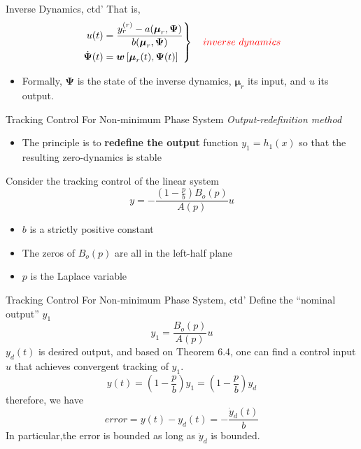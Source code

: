 \documentclass{beamer}
\renewcommand{\vec}[1]{\ensuremath{\boldsymbol{#1}}} %
\begin{document}
\begin{frame}{Inverse Dynamics, ctd'}
    That is, 
    \begin{equation}\label{inverse-dynamics}
      \left. \begin{aligned}
        u(t) &= \frac{y_{r}^{(r)}-a(\vec{\mu}_{r}, \vec{\Psi})}{b(\vec{\mu}_{r}, \vec{\Psi})} \\
        \dot{\vec{\Psi}}(t) &= \vec{w}\left[ \vec{\mu}_{r}(t),\vec{\Psi}(t) \right]
      \end{aligned} \right\} \quad {\color{red}inverse ~dynamics}
    \end{equation}
    \begin{itemize}
      \item Formally, $\vec{\Psi}$ is the state of the inverse dynamics, $\vec{\mu}_{r}$ its input, and $u$ its output.
    \end{itemize}
\end{frame}


\begin{frame}{Tracking Control For Non-minimum Phase System}
    \textit{\color{red}\large{Output-redefinition method}}
    \begin{itemize}
      \item The principle is to \textbf{redefine the output} function $y_{1}=h_{1}(x)$ so that the resulting zero-dynamics is stable
    \end{itemize}
    Consider the tracking control of the linear system
    \begin{equation}
        y=-\frac{\left(1-\frac{p}{b}\right) B_{o}(p)}{A(p)}u
    \end{equation}
    \begin{itemize}
      \item $b$ is a strictly positive constant
      \item The zeros of $B_{o}(p)$ are all in the left-half plane
      \item $p$ is the Laplace variable
    \end{itemize}
\end{frame}

\begin{frame}{Tracking Control For Non-minimum Phase System, ctd'}
    Define the {\color{red}``nominal output'' $y_{1}$}
    \begin{equation}\label{y1}
      y_{1}=\frac{B_{o}(p)}{A(p)}u
    \end{equation}
    $y_{d}(t)$ is desired output, and based on Theorem 6.4, one can find a control input $u$ that achieves {\color{red}convergent tracking of $y_{1}$}.
    \begin{equation}
        y(t)=\left(1-\frac{p}{b}\right) y_{1}=\left(1-\frac{p}{b}\right) y_{d}
    \end{equation}
    therefore, we have
    $$
        error = y(t)-y_{d}(t)=-\frac{\dot{y}_{d}(t)}{b}
    $$
    In particular,the error is {\color{red}bounded} as long as $\dot{y}_{d}$ is bounded.
\end{frame}
\end{document}
